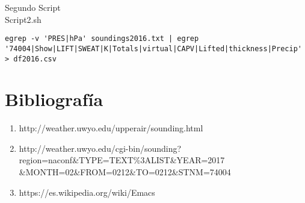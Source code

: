 \documentclass[12pt,a4paper]{article}
\begin{document}
\begin{centering}
Segundo Script \\
Script2.sh \\
\end{centering}
\begin{verbatim}
egrep -v 'PRES|hPa' soundings2016.txt | egrep 
'74004|Show|LIFT|SWEAT|K|Totals|virtual|CAPV|Lifted|thickness|Precip' > df2016.csv
\end{verbatim}

\section{Bibliografía}
\begin{enumerate}
\item http://weather.uwyo.edu/upperair/sounding.html \\
\item http://weather.uwyo.edu/cgi-bin/sounding?region=naconf\&TYPE=TEXT\%3ALIST\&YEAR=2017  \&MONTH=02\&FROM=0212\&TO=0212\&STNM=74004 \\
\item https://es.wikipedia.org/wiki/Emacs
\end{enumerate}
\end{document}
